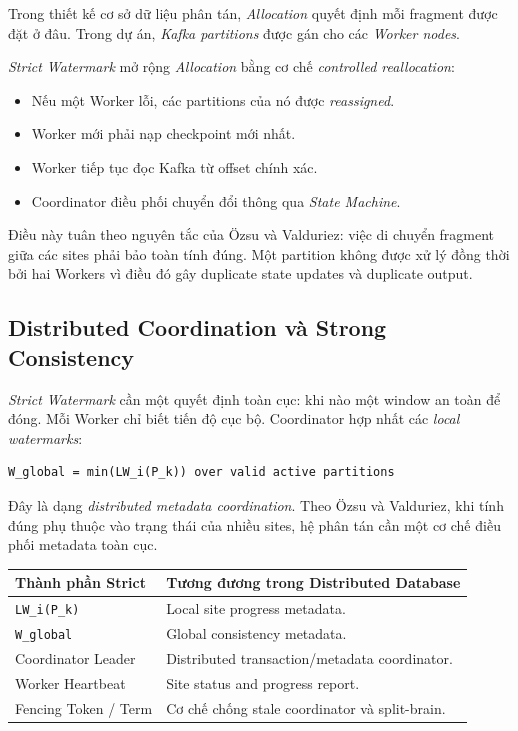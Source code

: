 \documentclass[12pt,a4paper]{article}
\begin{document}
Trong thiết kế cơ sở dữ liệu phân tán, \textit{Allocation} quyết định mỗi fragment được đặt ở đâu. Trong dự án, \textit{Kafka partitions} được gán cho các \textit{Worker nodes}.

\textit{Strict Watermark} mở rộng \textit{Allocation} bằng cơ chế \textit{controlled reallocation}:

\begin{itemize}
    \item Nếu một Worker lỗi, các partitions của nó được \textit{reassigned}.
    \item Worker mới phải nạp checkpoint mới nhất.
    \item Worker tiếp tục đọc Kafka từ offset chính xác.
    \item Coordinator điều phối chuyển đổi thông qua \textit{State Machine}.
\end{itemize}

Điều này tuân theo nguyên tắc của Özsu và Valduriez: việc di chuyển fragment giữa các sites phải bảo toàn tính đúng. Một partition không được xử lý đồng thời bởi hai Workers vì điều đó gây duplicate state updates và duplicate output.

\subsection{Distributed Coordination và Strong Consistency}

\textit{Strict Watermark} cần một quyết định toàn cục: khi nào một window an toàn để đóng. Mỗi Worker chỉ biết tiến độ cục bộ. Coordinator hợp nhất các \textit{local watermarks}:

\begin{lstlisting}
W_global = min(LW_i(P_k)) over valid active partitions
\end{lstlisting}

Đây là dạng \textit{distributed metadata coordination}. Theo Özsu và Valduriez, khi tính đúng phụ thuộc vào trạng thái của nhiều sites, hệ phân tán cần một cơ chế điều phối metadata toàn cục.

\begin{longtable}{p{} p{}}
\toprule
\textbf{Thành phần Strict} & \textbf{Tương đương trong Distributed Database} \\
\midrule
\endhead
\texttt{LW\_i(P\_k)} & Local site progress metadata. \\
\texttt{W\_global} & Global consistency metadata. \\
Coordinator Leader & Distributed transaction/metadata coordinator. \\
Worker Heartbeat & Site status and progress report. \\
Fencing Token / Term & Cơ chế chống stale coordinator và split-brain. \\
\bottomrule
\end{longtable}
\end{document}
